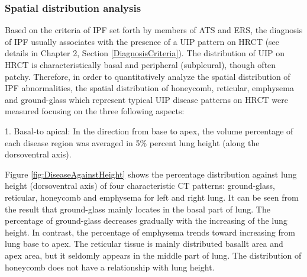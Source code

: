 \subsubsection{Spatial distribution analysis}
Based on the criteria of IPF set forth by members of ATS and ERS, the diagnosis of IPF usually associates with the presence of a UIP pattern on HRCT (see details in Chapter 2, Section \ref{DiagnosisCriteria}). The distribution of UIP on HRCT is characteristically basal and peripheral (subpleural), though often patchy. Therefore, in order to quantitatively analyze the spatial distribution of IPF abnormalities, the spatial distribution of honeycomb, reticular, emphysema and ground-glass which represent typical UIP disease patterns on HRCT were measured focusing on the three following aspects: 

1. Basal-to apical: In the direction from base to apex, the volume percentage of each disease region was averaged in 5\% percent lung height (along the dorsoventral axis). 

Figure \ref{fig:DiseaseAgainstHeight} shows the percentage distribution against lung height (dorsoventral axis) of four characteristic CT patterns: ground-glass, reticular, honeycomb and emphysema for left and right lung. It can be seen from the result that ground-glass mainly locates in the basal part of lung. The percentage of ground-glass decreases gradually with the increasing of the lung height. In contrast, the percentage of emphysema trends toward increasing from lung base to apex. The reticular tissue is mainly distributed basallt area and apex area, but it seldomly appears in the middle part of lung. The distribution of honeycomb does not have a relationship with lung height.
\newpage

